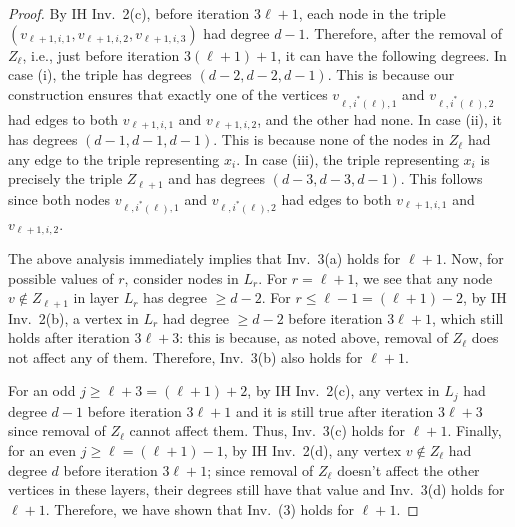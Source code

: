 \documentclass[11pt,letterpaper]{article}
\renewcommand{\geq}{\geqslant}
\renewcommand{\leq}{\leqslant}
\theoremstyle{definition}
\begin{document}
\begin{proof}
 By IH Inv.~2(c), before iteration $3\ell+1$, each node in the triple $(v_{\ell+1,i,1}, v_{\ell+1,i,2}, v_{\ell+1,i,3})$ had degree $d-1$. Therefore, after the removal of $Z_\ell$, i.e., just before iteration $3(\ell+1)+1$, it can have the following degrees. In case (i), the triple has degrees $(d-2, d-2, d-1)$. This is because our construction ensures that exactly one of the vertices $v_{\ell,i^*(\ell),1}$ and $v_{\ell,i^*(\ell),2}$ had edges to both $v_{\ell+1,i,1}$ and $v_{\ell+1,i,2}$, and the other had none. In case (ii), it has degrees $(d-1,d-1,d-1)$. This is because none of the nodes in $Z_{\ell}$ had any edge to the triple representing $x_i$. In case (iii), the triple representing $x_i$ is precisely the triple $Z_{\ell+1}$ and has degrees $(d-3,d-3,d-1)$. This follows since both nodes $v_{\ell,i^*(\ell),1}$ and $v_{\ell,i^*(\ell),2}$ had edges to both $v_{\ell+1,i,1}$ and $v_{\ell+1,i,2}$. 
 
 The above analysis immediately implies that Inv.~3(a) holds for $\ell+1$. Now, for possible values of $r$, consider nodes in $L_r$. For $r=\ell+1$, we see that any node $v\not\in Z_{\ell+1}$ in layer $L_r$ has degree $\geq d-2$. For $r\leq \ell-1=(\ell+1)-2$, by IH Inv.~2(b), a vertex in $L_r$ had degree $\geq d-2$ before iteration $3\ell+1$, which still holds after iteration $3\ell+3$: this is because, as noted above, removal of $Z_{\ell}$ does not affect any of them. Therefore, Inv.~3(b) also holds for $\ell+1$. 
 
 For an odd $j\geq \ell+3=(\ell+1)+2$, by IH Inv.~2(c), any vertex in $L_j$ had degree $d-1$ before iteration $3\ell+1$ and it is still true after iteration $3\ell+3$ since removal of $Z_{\ell}$ cannot affect them. Thus, Inv.~3(c) holds for $\ell+1$. Finally, for an even $j\geq \ell=(\ell+1)-1$, by IH Inv.~2(d), any vertex $v\not\in Z_\ell$ had degree $d$ before iteration $3\ell+1$; since removal of $Z_{\ell}$ doesn't affect the other vertices in these layers, their degrees still have that value and Inv.~3(d) holds for $\ell+1$. Therefore, we have shown that Inv.~(3) holds for $\ell+1$.


\end{proof}
\end{document}
